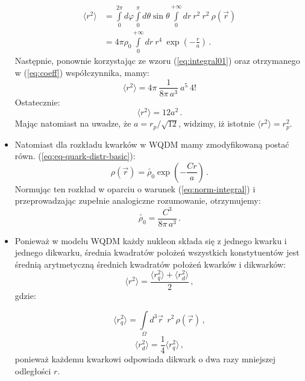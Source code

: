 \documentclass[a4paper,12pt]{article}
\begin{document}
\begin{itemize}
\[
\begin{split}
\langle r^2 \rangle & = \int\limits_{0}^{2\pi}d\varphi \int\limits_{0}^{\pi}d\theta \sin\theta \int\limits_{0}^{+\infty}dr \: r^2 \: r^2 \: \rho(\vec{r}) \\
 & = 4\pi \rho_0 \int\limits_{0}^{+\infty}dr\: r^4 \: \exp\left(-\frac{r}{a}\right)\,.
\end{split}
\]
Następnie, ponownie korzystając ze wzoru (\ref{eq:integral01}) oraz otrzymanego w (\ref{eq:coeff}) współczynnika, mamy:
\[ \langle r^2 \rangle = 4\pi \: \frac{1}{8\pi \, a^3} \: a^5 \: 4! \]
Ostatecznie:
\begin{equation} 
\langle r^2 \rangle = 12 a^2\,.
\end{equation}
Mając natomiast na uwadze, że $a = r_p/\sqrt{12}$, widzimy, iż istotnie $\langle r^2 \rangle = r_p^2$.

\item Natomiast dla rozkładu kwarków w WQDM mamy zmodyfikowaną postać równ. (\ref{eq:eq-quark-distr-basic}):
\begin{equation}
\rho(\vec{r}) = \widetilde{\rho_0} \exp\left(-\frac{Cr}{a}\right)\,.
\end{equation}
Normując ten rozkład w oparciu o warunek (\ref{eq:norm-integral}) i przeprowadzając zupełnie analogiczne rozumowanie, otrzymujemy:
\begin{equation}\label{eq:coeff2}
\widetilde{\rho_0} = \frac{C^3}{8\pi \, a^3}\,.
\end{equation}
\item Ponieważ w modelu WQDM każdy nukleon składa się z jednego kwarku i jednego dikwarku, średnia kwadratów położeń wszystkich konstytuentów jest średnią arytmetyczną średnich kwadratów położeń kwarków i dikwarków:
\begin{equation}\label{eq:avg-sq-wqdm}
\langle r^2 \rangle = \frac{\langle r_q^2 \rangle + \langle r_d^2 \rangle}{2}\,,
\end{equation}
gdzie: 

\begin{equation}
\langle r_q^2 \rangle = \int\limits_{\Omega} d^3\vec{r}\: \: r^2 \, \rho(\vec{r})\,,
\end{equation}
\begin{equation}
\langle r_d^2 \rangle = \frac{1}{4} \langle r_q^2 \rangle\,,
\end{equation}
ponieważ każdemu kwarkowi odpowiada dikwark o dwa razy mniejszej odległości $r$.


\end{itemize}
\end{document}
